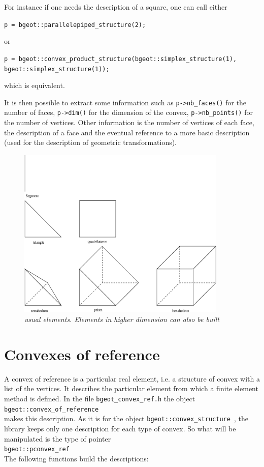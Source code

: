 \documentclass[11pt,a4paper]{article}
\begin{document}
For instance if one needs the description of a square, one can call either

{\tt p = bgeot::parallelepiped\_structure(2); }

or

{\tt p = bgeot::convex\_product\_structure(bgeot::simplex\_structure(1),\\        \mbox{} \hspace{18.5em} bgeot::simplex\_structure(1)); }

which is equivalent.

It is then possible to extract some information such as {\tt p->nb\_faces()} for the number of faces, {\tt p->dim()} for the dimension of the convex, {\tt p->nb\_points()} for the number of vertices. Other information is the number of vertices of each face, the description of a face and the eventual reference to a more basic description (used for the description of geometric transformations).

\begin{figure}[htb]
  \begin{center}
    \includegraphics[width=10cm,angle=0]{getfemelem_elem.eps}
  \end{center}
  \caption{ \it usual elements. Elements in higher dimension can also be built }
  \label{fig:elem}
\end{figure}

\rcc

\section{Convexes of reference}

A convex of reference is a particular real element, i.e. a structure of convex with a list of the vertices. It describes the particular element from which a finite element method is defined. In the file {\tt bgeot\_convex\_ref.h} the object\\[0.5cm]
{\tt bgeot::convex\_of\_reference }\\[0.5cm]
makes this description. As it is for the object {\tt bgeot::convex\_structure }, the library keeps only one  description for each type of convex. So what will be manipulated is the type of pointer\\[0.5cm]
{\tt bgeot::pconvex\_ref }\\[0.5cm]
The following functions build the descriptions:
\end{document}
